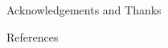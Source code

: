 \documentclass[final]{beamer}
\begin{document}
\begin{frame}{}
\begin{textblock}{27.7}
\begin{block}{Acknowledgements and Thanks}
\begin{multicols}{3}
      \end{multicols}

    \end{block}

    \begin{block}{References}
      
      
    \end{block}

    
  \end{textblock}

\end{frame}
\end{document}
